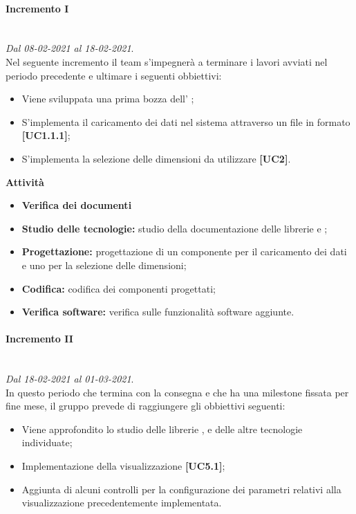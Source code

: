 \paragraph{Incremento I} \textit{}\\ \textit{Dal 08-02-2021 al 18-02-2021}. \\ Nel seguente incremento il team s'impegnerà a terminare i lavori avviati nel periodo precedente e ultimare i seguenti obbiettivi:
		\begin{itemize}
			\item Viene sviluppata una prima bozza dell' ;
			\item S'implementa il caricamento dei dati nel sistema attraverso un file in formato  \textbf{[UC1.1.1]};
			\item S'implementa la selezione delle dimensioni da utilizzare \textbf{[UC2]}.
		\end{itemize}	
		
\textbf{Attività}			

\begin{itemize}
\item \textbf{Verifica dei documenti}
\item \textbf{Studio delle tecnologie:} studio della documentazione delle librerie  e ;
\item \textbf{Progettazione:} progettazione di un componente per il caricamento dei dati e uno per la selezione delle dimensioni;
\item \textbf{Codifica:} codifica dei componenti progettati;
\item \textbf{Verifica software:} verifica sulle funzionalità software aggiunte.
\end{itemize}

\paragraph{Incremento II} \textit{}\\ \textit{Dal 18-02-2021 al 01-03-2021}.\\ In questo periodo che termina con la consegna e che ha una milestone fissata per fine mese, il gruppo prevede di raggiungere gli obbiettivi seguenti:
		\begin{itemize}
			\item Viene approfondito lo studio delle librerie ,  e delle altre tecnologie individuate;
			\item Implementazione della visualizzazione  \textbf{[UC5.1]};
			\item Aggiunta di alcuni controlli per la configurazione dei parametri relativi alla visualizzazione precedentemente implementata. 
		\end{itemize}			
	

